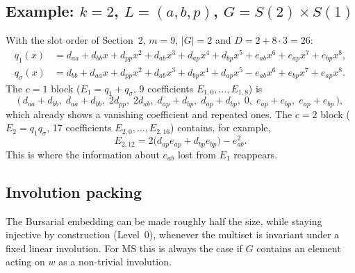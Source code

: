 \documentclass[11pt]{article}
\theoremstyle{definition}
\theoremstyle{remark}
\newcommand{\MS}{\mathrm{MS}}
\begin{document}
\subsection{Example: $k = 2$, $L = (a, b, p)$, $G = S(2) \times S(1)$}

With the slot order of Section~2, $m = 9$, $|G| = 2$ and $D = 2 + 8 \cdot 3 = 26$:
\begin{align*}
  q_1(x)      &= d_{aa} + d_{bb} x + d_{pp} x^2 + d_{ab} x^3 + d_{ap} x^4 + d_{bp} x^5
                 + e_{ab} x^6 + e_{ap} x^7 + e_{bp} x^8, \\
  q_\sigma(x) &= d_{bb} + d_{aa} x + d_{pp} x^2 + d_{ab} x^3 + d_{bp} x^4 + d_{ap} x^5
                 - e_{ab} x^6 + e_{bp} x^7 + e_{ap} x^8 .
\end{align*}
The $c = 1$ block ($E_1 = q_1 + q_\sigma$, 9 coefficients $E_{1,0}, \ldots, E_{1,8}$) is
\[
  \bigl(\, d_{aa}{+}d_{bb},\; d_{aa}{+}d_{bb},\; 2d_{pp},\; 2d_{ab},\;
     d_{ap}{+}d_{bp},\; d_{ap}{+}d_{bp},\; 0,\; e_{ap}{+}e_{bp},\; e_{ap}{+}e_{bp} \,\bigr),
\]
which already shows a vanishing coefficient and repeated ones. The $c = 2$
block ($E_2 = q_1 q_\sigma$, 17 coefficients $E_{2,0}, \ldots, E_{2,16}$) contains, for example,
\[
  E_{2,12} = 2\bigl( d_{ap} e_{ap} + d_{bp} e_{bp} \bigr) - e_{ab}^2 .
\]
This is where the information about $e_{ab}$ lost from $E_1$ reappears.

\subsection{Involution packing}\label{sec:involution}

The Bursarial embedding can be made roughly half the size, while staying
injective by construction (Level~0), whenever the multiset is invariant under a
fixed linear involution. For $\MS$ this is always the case if $G$ contains an
element acting on $w$ as a non-trivial involution.
\end{document}
